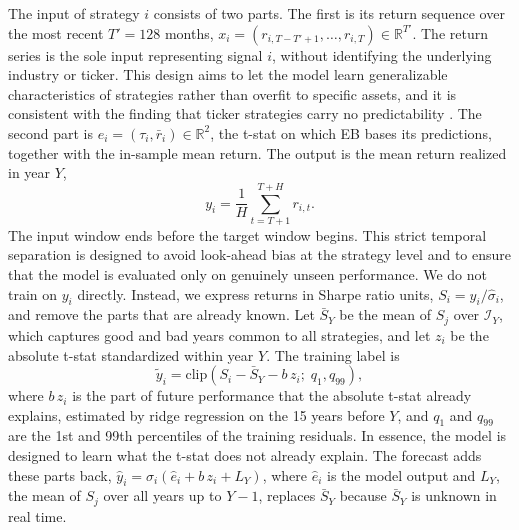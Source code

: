 \documentclass[pdflatex,sn-mathphys-num]{sn-jnl}%
\theoremstyle{thmstyleone}%
\theoremstyle{thmstyletwo}%
\theoremstyle{thmstylethree}%
\begin{document}
The input of strategy $i$ consists of two parts. The first is its return sequence over the most recent $T' = 128$ months, $x_i = (r_{i,T-T'+1}, \ldots, r_{i,T}) \in \mathbb{R}^{T'}$. The return series is the sole input representing signal $i$, without identifying the underlying industry or ticker. This design aims to let the model learn generalizable characteristics of strategies rather than overfit to specific assets, and it is consistent with the finding that ticker strategies carry no predictability \cite{chen2025highthroughputassetpricing}. The second part is $e_i = (\tau_i, \bar{r}_i) \in \mathbb{R}^2$, the t-stat on which EB bases its predictions, together with the in-sample mean return. The output is the mean return realized in year $Y$,
\begin{equation}
y_i = \frac{1}{H}\sum_{t=T+1}^{T+H} r_{i,t}.
\label{eq:target}
\end{equation}
The input window ends before the target window begins. This strict temporal separation is designed to avoid look-ahead bias at the strategy level and to ensure that the model is evaluated only on genuinely unseen performance. We do not train on $y_i$ directly. Instead, we express returns in Sharpe ratio units, $S_i = y_i / \hat{\sigma}_i$, and remove the parts that are already known. Let $\bar{S}_Y$ be the mean of $S_j$ over $\mathcal{I}_Y$, which captures good and bad years common to all strategies, and let $z_i$ be the absolute t-stat standardized within year $Y$. The training label is
\begin{equation}
\tilde{y}_i = \mathrm{clip}\!\left(S_i - \bar{S}_Y - b\, z_i;\; q_{1}, q_{99}\right),
\label{eq:label}
\end{equation}
where $b\, z_i$ is the part of future performance that the absolute t-stat already explains, estimated by ridge regression on the 15 years before $Y$, and $q_1$ and $q_{99}$ are the 1st and 99th percentiles of the training residuals. In essence, the model is designed to learn what the t-stat does not already explain. The forecast adds these parts back, $\hat{y}_i = \hat{\sigma}_i(\hat{e}_i + b\, z_i + L_Y)$, where $\hat{e}_i$ is the model output and $L_Y$, the mean of $S_j$ over all years up to $Y-1$, replaces $\bar{S}_Y$ because $\bar{S}_Y$ is unknown in real time.
\end{document}
